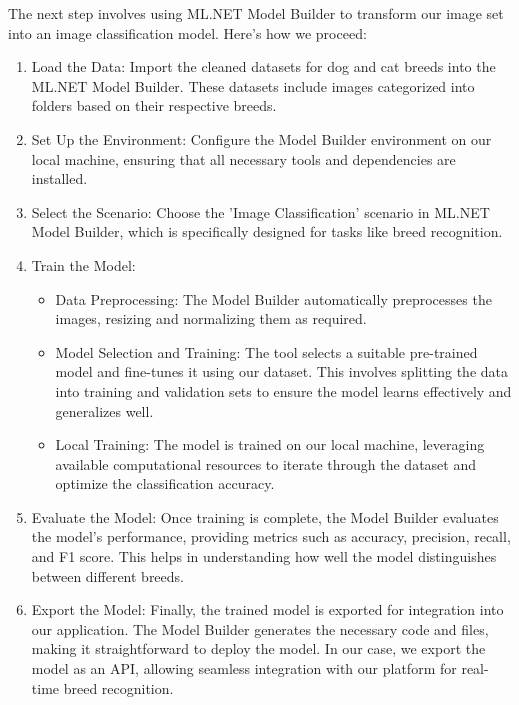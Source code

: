 The next step involves using ML.NET Model Builder to transform our image set into an image classification model. Here's how we proceed:
\begin{enumerate}
    \item Load the Data: Import the cleaned datasets for dog and cat breeds into the ML.NET Model Builder. These datasets include images 
    categorized into folders based on their respective breeds.
    \item Set Up the Environment: Configure the Model Builder environment on our local machine, ensuring that all necessary tools and dependencies are installed.
    \item Select the Scenario: Choose the 'Image Classification' scenario in ML.NET Model Builder, which is specifically designed for tasks like breed recognition.
    \item Train the Model:
    \begin{itemize}
        \item Data Preprocessing: The Model Builder automatically preprocesses the images, resizing and normalizing them as required.
        \item Model Selection and Training: The tool selects a suitable pre-trained model and fine-tunes it using our dataset. This involves 
        splitting the data into training and validation sets to ensure the model learns effectively and generalizes well.
        \item Local Training: The model is trained on our local machine, leveraging available computational resources to iterate through 
        the dataset and optimize the classification accuracy.
    \end{itemize}
    \item Evaluate the Model: Once training is complete, the Model Builder evaluates the model's performance, 
    providing metrics such as accuracy, precision, recall, and F1 score. This helps in understanding how well 
    the model distinguishes between different breeds.
    \item Export the Model: Finally, the trained model is exported for integration into our application. 
    The Model Builder generates the necessary code and files, making it straightforward to deploy the model.
    In our case, we export the model as an API, allowing seamless integration with our platform for real-time breed recognition.
\end{enumerate}